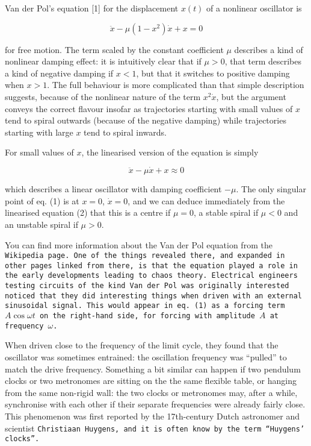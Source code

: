   Van der Pol's equation [1] for the displacement $x(t)$ of a nonlinear 
  oscillator is 

  $$\ddot{x}-\mu (1-x^2) \dot{x} + x =0 \tag{1}$$ 

  for free motion. The term scaled by the constant coefficient $\mu$ describes 
  a kind of nonlinear damping effect: it is intuitively clear that if $\mu > 
  0$, that term describes a kind of negative damping if $x < 1$, but that it 
  switches to positive damping when $x > 1$. The full behaviour is more 
  complicated than that simple description suggests, because of the nonlinear 
  nature of the term $x^2 \dot{x}$, but the argument conveys the correct 
  flavour insofar as trajectories starting with small values of $x$ tend to 
  spiral outwards (because of the negative damping) while trajectories starting 
  with large $x$ tend to spiral inwards. 

  For small values of $x$, the linearised version of the equation is simply 

  $$\ddot{x}-\mu \dot{x} + x \approx 0 \tag{2}$$ 

  which describes a linear oscillator with damping coefficient $-\mu$. The only 
  singular point of eq. (1) is at $x=0$, $\dot{x}=0$, and we can deduce 
  immediately from the linearised equation (2) that this is a centre if 
  $\mu=0$, a stable spiral if $ \mu < 0$ and an unstable spiral if $\mu > 0$. 

  You can find more information about the Van der Pol equation from the 
  \tt{}Wikipedia page\rm{}. One of the things revealed there, and expanded in 
  other pages linked from there, is that the equation played a role in the 
  early developments leading to chaos theory. Electrical engineers testing 
  circuits of the kind Van der Pol was originally interested noticed that they 
  did interesting things when driven with an external sinusoidal signal. This 
  would appear in eq. (1) as a forcing term $A \cos \omega t$ on the right-hand 
  side, for forcing with amplitude $A$ at frequency $\omega$. 

  When driven close to the frequency of the limit cycle, they found that the 
  oscillator was sometimes entrained: the oscillation frequency was ``pulled'' 
  to match the drive frequency. Something a bit similar can happen if two 
  pendulum clocks or two metronomes are sitting on the the same flexible table, 
  or hanging from the same non-rigid wall: the two clocks or metronomes may, 
  after a while, synchronise with each other if their separate frequencies were 
  already fairly close. This phenomenon was first reported by the 17th-century 
  Dutch astronomer and scientist \tt{}Christiaan Huygens\rm{}, and it is often 
  know by the term ``Huygens' clocks''. 

